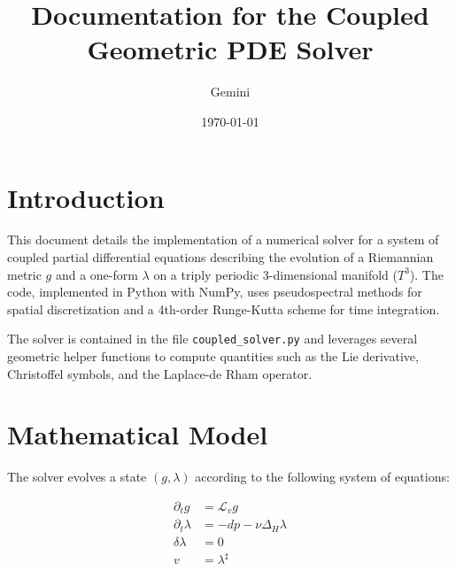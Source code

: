 \documentclass{article}
\title{Documentation for the Coupled Geometric PDE Solver}
\author{Gemini}
\date{\today}
\begin{document}
\maketitle

\section{Introduction}
This document details the implementation of a numerical solver for a system of coupled partial differential equations describing the evolution of a Riemannian metric $g$ and a one-form $\lambda$ on a triply periodic 3-dimensional manifold ($T^3$). The code, implemented in Python with NumPy, uses pseudospectral methods for spatial discretization and a 4th-order Runge-Kutta scheme for time integration.

The solver is contained in the file \texttt{coupled\_solver.py} and leverages several geometric helper functions to compute quantities such as the Lie derivative, Christoffel symbols, and the Laplace-de Rham operator.

\section{Mathematical Model}
The solver evolves a state $(g, \lambda)$ according to the following system of equations:

\begin{align}
    \partial_t g &= \mathcal{L}_v g \label{eq:g_evolution} \\
    \partial_t \lambda &= -dp - \nu \Delta_H \lambda \label{eq:lambda_evolution} \\
    \delta \lambda &= 0 \label{eq:constraint} \\
    v &= \lambda^\sharp \label{eq:closure}
\end{align}
\end{document}
